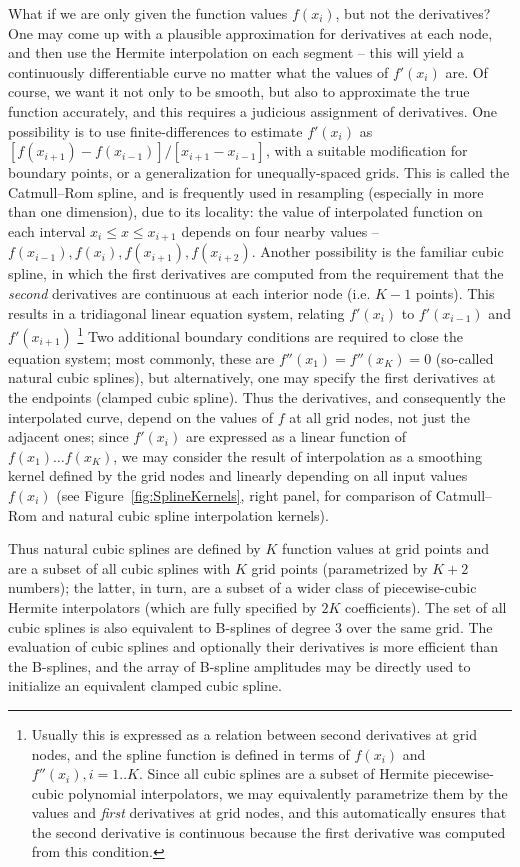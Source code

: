 \documentclass[12pt]{article}
\begin{document}
What if we are only given the function values $f(x_i)$, but not the derivatives? One may come up with a plausible approximation for derivatives at each node, and then use the Hermite interpolation on each segment -- this will yield a continuously differentiable curve no matter what the values of $f'(x_i)$ are. Of course, we want it not only to be smooth, but also to approximate the true function accurately, and this requires a judicious assignment of derivatives. One possibility is to use finite-differences to estimate $f'(x_i)$ as $[f(x_{i+1})-f(x_{i-1})]/[x_{i+1}-x_{i-1}]$, with a suitable modification for boundary points, or a generalization for unequally-spaced grids. This is called the Catmull--Rom spline, and is frequently used in resampling (especially in more than one dimension), due to its locality: the value of interpolated function on each interval $x_i\le x\le x_{i+1}$ depends on four nearby values -- $f(x_{i-1}), f(x_i), f(x_{i+1}), f(x_{i+2})$.
Another possibility is the familiar cubic spline, in which the first derivatives are computed from the requirement that the \textit{second} derivatives are continuous at each interior node (i.e. $K-1$ points). This results in a tridiagonal linear equation system, relating $f'(x_i)$ to $f'(x_{i-1})$ and $f'(x_{i+1})$%
\footnote{Usually this is expressed as a relation between second derivatives at grid nodes, and the spline function is defined in terms of $f(x_i)$ and $f''(x_i), i=1..K$. Since all cubic splines are a subset of Hermite piecewise-cubic polynomial interpolators, we may equivalently parametrize them by the values and \textit{first} derivatives at grid nodes, and this automatically ensures that the second derivative is continuous because the first derivative was computed from this condition.}
Two additional boundary conditions are required to close the equation system; most commonly, these are $f''(x_1) = f''(x_K) = 0$ (so-called natural cubic splines), but alternatively, one may specify the first derivatives at the endpoints (clamped cubic spline). Thus the derivatives, and consequently the interpolated curve, depend on the values of $f$ at all grid nodes, not just the adjacent ones; since $f'(x_i)$ are expressed as a linear function of $f(x_1)\dots f(x_K)$, we may consider the result of interpolation as a smoothing kernel defined by the grid nodes and linearly depending on all input values $f(x_i)$ (see Figure~\ref{fig:SplineKernels}, right panel, for comparison of Catmull--Rom and natural cubic spline interpolation kernels).

Thus natural cubic splines are defined by $K$ function values at grid points and are a subset of all cubic splines with $K$ grid points (parametrized by $K+2$ numbers); the latter, in turn, are a subset of a wider class of piecewise-cubic Hermite interpolators (which are fully specified by $2K$ coefficients). The set of all cubic splines is also equivalent to B-splines of degree 3 over the same grid. The evaluation of cubic splines and optionally their derivatives is more efficient than the B-splines, and the array of B-spline amplitudes may be directly used to initialize an equivalent clamped cubic spline.
\end{document}
